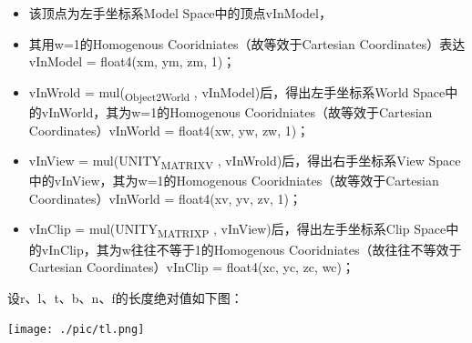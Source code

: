 \documentclass[9pt, b5paper]{article}
\begin{document}
\begin{itemize}
\item 该顶点为左手坐标系Model Space中的顶点vInModel，
\item 其用w=1的Homogenous Cooridniates（故等效于Cartesian Coordinates）表达vInModel = float4(xm, ym, zm, 1)；
\item vInWrold = mul(\textsubscript{Object2World} , vInModel)后，得出左手坐标系World Space中的vInWorld，其为w=1的Homogenous Cooridniates（故等效于Cartesian Coordinates）vInWorld = float4(xw, yw, zw, 1)；
\item vInView = mul(UNITY\textsubscript{MATRIX}\textsubscript{V} , vInWrold)后，得出右手坐标系View Space中的vInView，其为w=1的Homogenous Cooridniates（故等效于Cartesian Coordinates）vInWorld = float4(xv, yv, zv, 1)；
\item vInClip = mul(UNITY\textsubscript{MATRIX}\textsubscript{P} , vInView)后，得出左手坐标系Clip Space中的vInClip，其为w往往不等于1的Homogenous Cooridniates（故往往不等效于Cartesian Coordinates）vInClip = float4(xc, yc, zc, wc)；
\end{itemize}

设r、l、t、b、n、f的长度绝对值如下图：

\begin{center}
\texttt{[image: ./pic/tl.png]}
\end{center}
\end{document}
